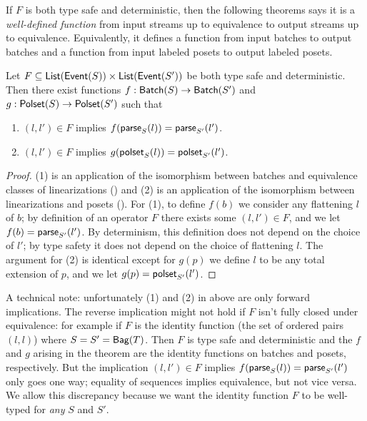 If $F$ is both type safe and deterministic, then the following theorems says it is a \emph{well-defined function} from input streams up to equivalence to output streams up to equivalence.
Equivalently, it defines a function from input batches to output batches
and a function from input labeled posets to output labeled posets.

\begin{theorem}
\label{thm:type-safe-and-deterministic-consequence}
Let $F \subseteq \listtype{\event{S}} \times \listtype{\event{S'}}$ be both type safe and deterministic.
Then there exist functions $f: \batch{S} \to \batch{S'}$ and $g: \poset{S} \to \poset{S'}$
such that
\begin{enumerate}
\item[(1)] $(l, l') \in F$ implies $f(\parselin{l}{S}) = \parselin{l'}{S'}$.
\item[(2)] $(l, l') \in F$ implies $g(\posetlin{l}{S}) = \posetlin{l'}{S'}$.
\end{enumerate}
\end{theorem}
\begin{proof}
(1) is an application of the isomorphism between batches and equivalence classes of linearizations () and (2) is an application of the isomorphism between linearizations and posets ().
For (1), to define $f(b)$ we consider any flattening $l$ of $b$; by definition of an operator $F$ there exists some $(l, l') \in F$, and we let $f(b) = \parselin{l'}{S'}$. By determinism, this definition does not depend on the choice of $l'$; by type safety it does not depend on the choice of flattening $l$.
The argument for (2) is identical except for $g(p)$ we define $l$ to be any total extension of $p$, and we let $g(p) = \posetlin{l'}{S'}$.
\end{proof}

A technical note: unfortunately (1) and (2) in  above are only forward implications.
The reverse implication might not hold if $F$ isn't fully closed under equivalence: for example if $F$ is the identity function (the set of ordered pairs $(l, l)$) where $S = S' = \relleaf{T}$. Then $F$ is type safe and deterministic and the $f$ and $g$ arising in the theorem are the identity functions on batches and posets, respectively. But the implication $(l, l') \in F$ implies $f(\parselin{l}{S}) = \parselin{l'}{S'}$ only goes one way; equality of sequences implies equivalence, but not vice versa.
We allow this discrepancy because we want the identity function $F$ to be well-typed for \emph{any} $S$ and $S'$.

